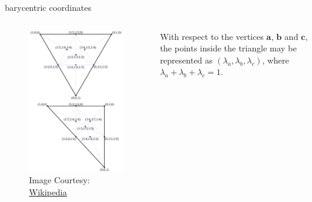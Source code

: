 \documentclass[aspectratio=169,xcolor={dvipsnames,svgnames}]{beamer}
\begin{document}
\begin{frame}[label={sec:org2fb5744}]{barycentric coordinates}
\begin{columns}
\begin{column}{.3\columnwidth}
\begin{figure}[htbp]
\centering
\includegraphics[width=.9\linewidth]{images/TriangleBarycentricCoordinates.svg.png}
\caption{Image Courtesy: \href{https://commons.wikimedia.org/wiki/File:TriangleBarycentricCoordinates.svg}{Wikipedia}}
\end{figure}
\end{column}

\begin{column}{.5\columnwidth}
With respect to the vertices \(\mathbf{a}\), \(\mathbf{b}\)
and \(\mathbf{c}\), the points inside the triangle may be
represented as \((\lambda_{a},\lambda_{b},\lambda_{c})\),
where \(\lambda_{a} + \lambda_{b} + \lambda_{c} = 1\).
\end{column}
\end{columns}
\end{frame}
\end{document}
